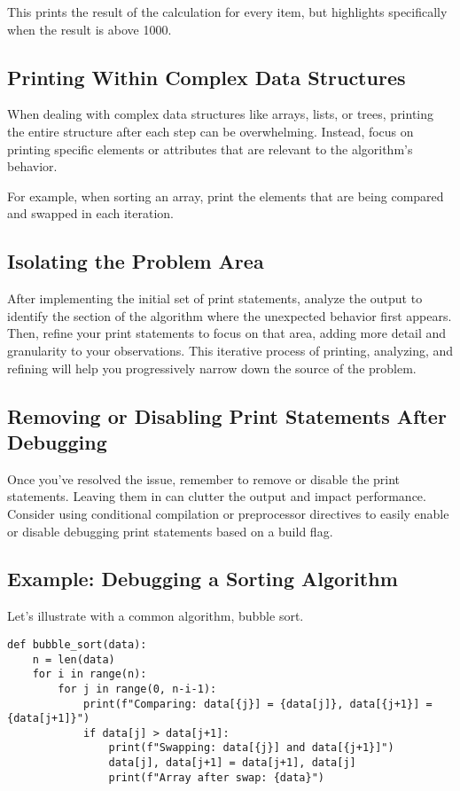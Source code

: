 \documentclass{article}
\begin{document}
{{{This prints the result of the calculation for every item, but highlights specifically when the result is above 1000.

\subsection*{Printing Within Complex Data Structures}

When dealing with complex data structures like arrays, lists, or trees, printing the entire structure after each step can be overwhelming. Instead, focus on printing specific elements or attributes that are relevant to the algorithm's behavior.

For example, when sorting an array, print the elements that are being compared and swapped in each iteration.

\subsection*{Isolating the Problem Area}

After implementing the initial set of print statements, analyze the output to identify the section of the algorithm where the unexpected behavior first appears. Then, refine your print statements to focus on that area, adding more detail and granularity to your observations. This iterative process of printing, analyzing, and refining will help you progressively narrow down the source of the problem.

\subsection*{Removing or Disabling Print Statements After Debugging}

Once you've resolved the issue, remember to remove or disable the print statements. Leaving them in can clutter the output and impact performance. Consider using conditional compilation or preprocessor directives to easily enable or disable debugging print statements based on a build flag.

\subsection*{Example: Debugging a Sorting Algorithm}

Let's illustrate with a common algorithm, bubble sort.

\begin{verbatim}
def bubble_sort(data):
    n = len(data)
    for i in range(n):
        for j in range(0, n-i-1):
            print(f"Comparing: data[{j}] = {data[j]}, data[{j+1}] = {data[j+1]}")
            if data[j] > data[j+1]:
                print(f"Swapping: data[{j}] and data[{j+1}]")
                data[j], data[j+1] = data[j+1], data[j]
                print(f"Array after swap: {data}")
\end{verbatim}

}}}
\end{document}
